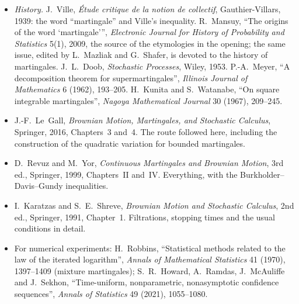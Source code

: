\begin{itemize}
\item \emph{History.} J.~Ville, \emph{\'Etude critique de la notion de collectif}, Gauthier-Villars, 1939: the word ``martingale'' and Ville's inequality. R.~Mansuy, ``The origins of the word `martingale''',
\emph{Electronic Journal for History of Probability and Statistics} 5(1), 2009, the source of the etymologies in the opening; the same issue, edited by L.~Mazliak and G.~Shafer, is devoted to the history of
martingales. J.~L.~Doob, \emph{Stochastic Processes}, Wiley, 1953. P.-A.~Meyer, ``A decomposition theorem for supermartingales'', \emph{Illinois Journal of Mathematics} 6 (1962), 193--205.
H.~Kunita and S.~Watanabe, ``On square integrable martingales'', \emph{Nagoya Mathematical Journal} 30 (1967), 209--245.
\item J.-F.~Le~Gall, \emph{Brownian Motion, Martingales, and Stochastic Calculus}, Springer, 2016, Chapters~3 and~4. The route followed here, including the construction of the quadratic variation for
bounded martingales.
\item D.~Revuz and M.~Yor, \emph{Continuous Martingales and Brownian Motion}, 3rd ed., Springer, 1999, Chapters~II and~IV. Everything, with the Burkholder--Davis--Gundy inequalities.
\item I.~Karatzas and S.~E.~Shreve, \emph{Brownian Motion and Stochastic Calculus}, 2nd ed., Springer, 1991, Chapter~1. Filtrations, stopping times and the usual conditions in detail.
\item For numerical experiments: H.~Robbins, ``Statistical methods related to the law of the iterated logarithm'', \emph{Annals of Mathematical Statistics} 41 (1970), 1397--1409 (mixture martingales);
S.~R.~Howard, A.~Ramdas, J.~McAuliffe and J.~Sekhon, ``Time-uniform, nonparametric, nonasymptotic confidence sequences'', \emph{Annals of Statistics} 49 (2021), 1055--1080.
\end{itemize}
